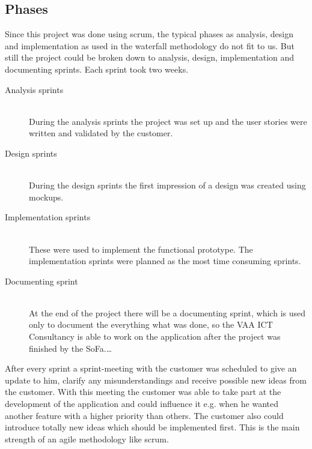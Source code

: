 \subsection{Phases}
Since this project was done using scrum, the typical phases as analysis, design and implementation as used in the waterfall methodology do not fit to us. But still the project could be broken down to analysis, design, implementation and documenting sprints. Each sprint took two weeks. 
\begin{description}
	\item[Analysis sprints] \hfill \\
	During the analysis sprints the project was set up and the user stories were written and validated by the customer. 
	\item[Design sprints] \hfill \\
	During the design sprints the first impression of a design was created using mockups. 
	\item[Implementation sprints] \hfill \\
	These were used to implement the functional prototype. The implementation sprints were planned as the most time consuming sprints.
	\item[Documenting sprint] \hfill \\
	At the end of the project there will be a documenting sprint, which is used only to document the everything what was done, so the VAA ICT Consultancy is able to work on the application after the project was finished by the SoFa.\ldots
\end{description}

After every sprint a sprint-meeting with the customer was scheduled to give an update to him, clarify any misunderstandings and receive possible new ideas from the customer. With this meeting the customer was able to take part at the development of the application and could influence it e.g. when he wanted another feature with a higher priority than others. The customer also could introduce totally new ideas which should be implemented first. This is the main strength of an agile methodology like scrum.